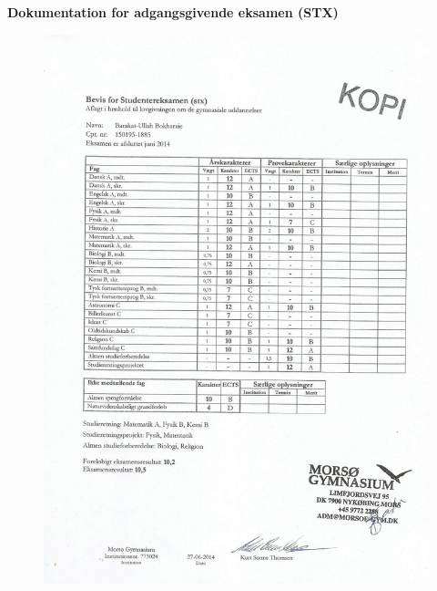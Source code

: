 \documentclass[../Ansoegning.tex]{subfiles}
\begin{document}
\begin{center}
    \Large{\textbf{Dokumentation for adgangsgivende eksamen (STX)}}\vspace{-0.7cm}
\end{center}

\begin{figure}[H]
	\centering
	\includegraphics[width=1\textwidth]{Eksterne_filer/gym_kar.jpg}
\end{figure}
\end{document}
